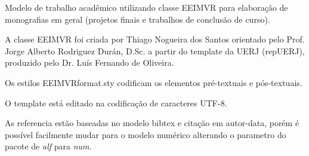 
Modelo de trabalho acadêmico utilizando classe EEIMVR para elaboração de monografias em geral (projetos finais e trabalhos de conclusão de curso).

A classe EEIMVR foi criada por Thiago Nogueira dos Santos orientado pelo Prof. Jorge Alberto Rodriguez Durán, D.Sc. a partir do template da UERJ (repUERJ), produzido pelo Dr. Luís Fernando de Oliveira.

Os estilos EEIMVRformat.sty codificam os elementos pré-textuais e pós-textuais.

O template está editado na codificação de caracteres UTF-8.

As referencia estão baseadas no modelo bibtex e citação em autor-data, porém é possível facilmente mudar para o modelo numérico alterando o parametro do pacote de \textit{alf} para \textit{num}.

